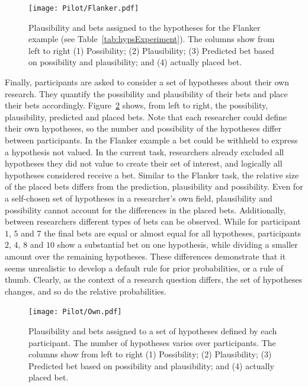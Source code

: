\documentclass[man]{apa6}
\begin{document}
\begin{figure}
	\texttt{[image: Pilot/Flanker.pdf]}
	\caption{Plausibility and bets assigned to the hypotheses for the Flanker example (see Table~\ref{tab:hypsExperiment}). The columns show from left to right (1) Possibility; (2) Plausibility; (3) Predicted bet based on possibility and plausibility; and (4) actually placed bet.}
	\label{fig:flanker}
\end{figure}

Finally, participants are asked to consider a set of hypotheses about their own research.
They quantify the possibility and plausibility of their bets and place their bets accordingly.
Figure~\ref{fig:ownhyp} shows, from left to right, the possibility, plausibility, predicted and placed bets.
Note that each researcher could define their own hypotheses, so the number and possibility of the hypotheses differ between participants.
In the Flanker example a bet could be withheld to express a hypothesis not valued.
In the current task, researchers already excluded all hypotheses they did not value to create their set of interest, and logically all hypotheses considered receive a bet.
Similar to the Flanker task, the relative size of the placed bets differs from the prediction, plausibility and possibility.
Even for a self-chosen set of hypotheses in a researcher's own field, plausibility and possibility cannot account for the differences in the placed bets.
Additionally, between researchers different types of bets can be observed. 
While for participant $1$, $5$ and $7$ the final bets are equal or almost equal for all hypotheses, participants $2$, $4$, $8$ and $10$ show a substantial bet on one hypothesis, while dividing a smaller amount over the remaining hypotheses.
These differences demonstrate that it seems unrealistic to develop a default rule for prior probabilities, or a rule of thumb. 
Clearly, as the context of a research question differs, the set of hypotheses changes, and so do the relative probabilities.

\begin{figure}
	\texttt{[image: Pilot/Own.pdf]}
	\caption{Plausibility and bets assigned to a set of hypotheses defined by each participant. The number of hypotheses varies over participants. The columns show from left to right (1) Possibility; (2) Plausibility; (3) Predicted bet based on possibility and plausibility; and (4) actually placed bet.}
	\label{fig:ownhyp}
\end{figure}
\end{document}
